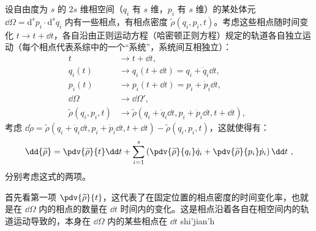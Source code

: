 设自由度为 $s$ 的 $2s$ 维相空间（$q_i$ 有 $s$ 维，$p_i$ 有 $s$ 维）的某处体元 $\dd \Omega = \mathrm{d}^{s}{p_i} \cdot  \mathrm{d}^{s}{q_i}$ 内有一些相点，有相点密度 $\widetilde \rho(q_i, p_i, t)$。考虑这些相点随时间变化 $t \rightarrow t + \dd t$，各自沿由正则运动方程（哈密顿正则方程）规定的轨道各自独立运动（每个相点代表系综中的一个“系统”，系统间互相独立）：
$$
\begin{aligned}
t                            &\rightarrow t+\dd t, \\
q_i(t)                       &\rightarrow q_i(t+\dd t) = q_i + \dot q_i \dd t, \\
p_i(t)                       &\rightarrow p_i(t+\dd t) = p_i + \dot p_i \dd t, \\
\dd \Omega                   &\rightarrow \dd \Omega', \\
\widetilde \rho(q_i, p_i, t) &\rightarrow \widetilde \rho(q_i + \dot q_i \dd t, p_i + \dot p_i \dd t, t + \dd t),
\end{aligned}~~
$$
考虑 $\dd{\widetilde{\rho}} = \widetilde{\rho}(q_i + \dot q_i \dd t, p_i + \dot p_i \dd t, t + \dd t) - \widetilde{\rho}(q_i, p_i, t)$，这就使得有：
\begin{equation}
\dd{\widetilde \rho} = \pdv{\widetilde \rho}{t} \dd t + \sum_{i=1}^{s}\left(\pdv{\widetilde \rho}{q_i}\dot q_i + \pdv{\widetilde \rho}{p_i}\dot p_i\right) \dd t  ~,
\end{equation}
分别考虑这式的两项。

首先看第一项 $\pdv{\widetilde \rho}{t}$，这代表了在固定位置的相点密度的时间变化率，也就是在 $\dd \Omega$ 内的相点的数量在 $\dd t$ 时间内的变化。这是相点沿着各自在相空间内的轨道运动导致的，本身在 $\dd \Omega$ 内的某些相点在 $\dd t$ shi'jian'h
